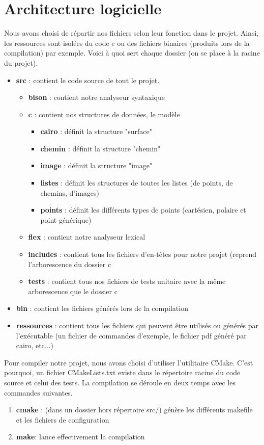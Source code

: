 \documentclass[a4paper, 12pt]{report}
\begin{document}
\newpage
\section{Architecture logicielle}
Nous avons choisi de répartir nos fichiers selon leur fonction dans le projet. Ainsi, les ressources sont isolées du code c ou des fichiers binaires (produits lors de la compilation) par exemple. Voici à quoi sert chaque dossier (on se place à la racine du projet).
 
\begin{itemize}
\item \textbf{src} : contient le code source de tout le projet.
	\begin{itemize}
		\item \textbf{bison} : contient notre analyseur syntaxique
		\item \textbf{c} : contient nos structures de données, le modèle
			\begin{itemize}
				\item \textbf{cairo} : définit la structure "surface"
				\item \textbf{chemin} : définit la structure "chemin"
				\item \textbf{image} : définit la structure "image"
				\item \textbf{listes} : définit les structures de toutes les listes (de points, de chemins, d'images)
				\item \textbf{points} : définit les différents types de points (cartésien, polaire et point générique)
			\end{itemize}
		\item \textbf{flex} : contient notre analyseur lexical
		\item \textbf{includes} : contient tous les fichiers d'en-têtes pour notre projet (reprend l'arborescence du dossier c
		\item \textbf{tests} : contient tous nos fichiers de tests unitaire avec la même arborescence que le dossier c
	\end{itemize}
\item \textbf{bin} : contient les fichiers générés lors de la compilation
\item \textbf{ressources} : contient tous les fichiers qui peuvent être utilisés ou générés par l'exécutable (un fichier de commandes d'exemple, le fichier pdf généré par cairo, etc...)
\end{itemize}

Pour compiler notre projet, nous avons choisi d'utiliser l'utilitaire CMake. C'est pourquoi, un fichier CMakeLists.txt existe dans le répertoire racine du code source et celui des tests. La compilation se déroule en deux temps avec les commandes suivantes.
\begin{enumerate}
\item \textbf{cmake} : (dans un dossier hors répertoire src/) génère les différents makefile et les fichiers de configuration
\item \textbf{make}: lance effectivement la compilation
\end{enumerate}
\end{document}
